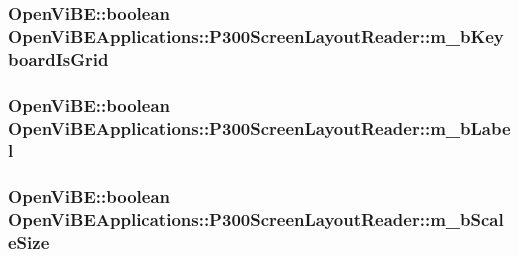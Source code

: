 \label{classOpenViBEApplications_1_1P300ScreenLayoutReader_af2acb9e994ede69d877a6124b414c4cf}
\hypertarget{classOpenViBEApplications_1_1P300ScreenLayoutReader_aeea45d6be6df192f63cb7685e90762a0}{
\subsubsection[{m\_\-bKeyboardIsGrid}]{\setlength{\rightskip}{0pt plus 5cm}OpenViBE::boolean {\bf OpenViBEApplications::P300ScreenLayoutReader::m\_\-bKeyboardIsGrid}}}
\label{classOpenViBEApplications_1_1P300ScreenLayoutReader_aeea45d6be6df192f63cb7685e90762a0}
\hypertarget{classOpenViBEApplications_1_1P300ScreenLayoutReader_adb61b9176dd1167e810a4cbabec770af}{
\subsubsection[{m\_\-bLabel}]{\setlength{\rightskip}{0pt plus 5cm}OpenViBE::boolean {\bf OpenViBEApplications::P300ScreenLayoutReader::m\_\-bLabel}}}
\label{classOpenViBEApplications_1_1P300ScreenLayoutReader_adb61b9176dd1167e810a4cbabec770af}
\hypertarget{classOpenViBEApplications_1_1P300ScreenLayoutReader_ae8dd0bcf7a51da978ab79540258b545f}{
\subsubsection[{m\_\-bScaleSize}]{\setlength{\rightskip}{0pt plus 5cm}OpenViBE::boolean {\bf OpenViBEApplications::P300ScreenLayoutReader::m\_\-bScaleSize}}}
